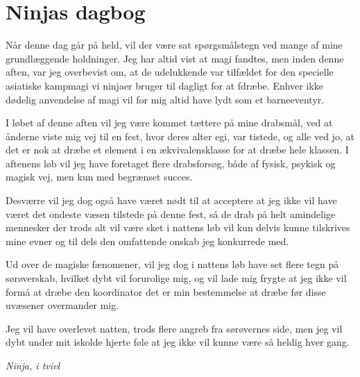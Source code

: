 \begin{minipage}[t]{100mm}
\vspace{3mm}
\section*{Ninjas dagbog}
Når denne dag går på held, vil der være sat spørgsmålstegn ved mange af mine grundlæggende holdninger. Jeg har altid vist at magi fandtes, men inden denne aften, var jeg overbevist om, at de udelukkende var tilfældet for den specielle asiatiske kampmagi vi ninjaer bruger til dagligt for at fdræbe. Enhver ikke dødelig anvendelse af magi vil for mig altid have lydt som et barneeventyr.

I løbet af denne aften vil jeg være kommet tættere på mine drabsmål, ved at ånderne viste mig vej til en fest, hvor deres alter egi, var tistede, og alle ved jo, at det er nok at dræbe et element i en ækvivalensklasse for at dræbe hele klassen. I aftenens løb vil jeg have foretaget flere drabsforsøg, både af fysisk, psykisk og magisk vej, men kun med begrænset succes.

Desværre vil jeg dog også have været nødt til at acceptere at jeg ikke vil have været det ondeste væsen tilstede på denne fest, så de drab på helt amindelige mennesker der trods alt vil være sket i nattens løb vil kun delvis kunne tilskrives mine evner og til dels den omfattende onskab jeg konkurrede med.

Ud over de magiske fænomener, vil jeg dog i nattens løb have set flere tegn på sørøverskab, hvilket dybt vil forurolige mig, og vil lade mig frygte at jeg ikke vil formå at dræbe den koordinator det er min bestemmelse at dræbe før disse uvæsener overmander mig.

Jeg vil have overlevet natten, trods flere angreb fra sørøvernes side, men jeg vil dybt under mit iskolde hjerte føle at jeg ikke vil kunne være så heldig hver gang.

\emph{Ninja, i tvivl}

\end{minipage}


